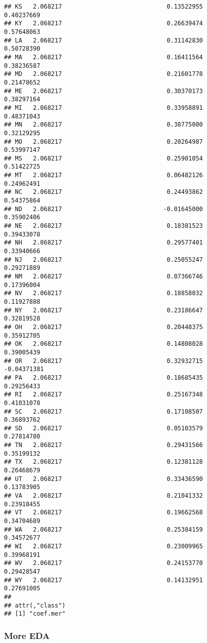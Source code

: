 \documentclass[
]{article}
\begin{document}
\begin{verbatim}
## KS   2.068217                             0.13522955             0.40237669
## KY   2.068217                             0.26639474             0.57648063
## LA   2.068217                             0.31142830             0.50728390
## MA   2.068217                             0.16411564             0.38236587
## MD   2.068217                             0.21601778             0.21478652
## ME   2.068217                             0.30370173             0.38297164
## MI   2.068217                             0.33958891             0.48371043
## MN   2.068217                             0.38775000             0.32129295
## MO   2.068217                             0.20264987             0.53997147
## MS   2.068217                             0.25901054             0.51422725
## MT   2.068217                             0.06482126             0.24962491
## NC   2.068217                             0.24493862             0.54375864
## ND   2.068217                            -0.01645000             0.35902406
## NE   2.068217                             0.18381523             0.39433078
## NH   2.068217                             0.29577401             0.33940666
## NJ   2.068217                             0.25055247             0.29271889
## NM   2.068217                             0.07366746             0.17396004
## NV   2.068217                             0.18858032             0.11927888
## NY   2.068217                             0.23186647             0.32819528
## OH   2.068217                             0.20448375             0.35912705
## OK   2.068217                             0.14808028             0.39005439
## OR   2.068217                             0.32932715            -0.04371381
## PA   2.068217                             0.18685435             0.29256433
## RI   2.068217                             0.25167348             0.41031078
## SC   2.068217                             0.17108507             0.36893762
## SD   2.068217                             0.05103579             0.27814780
## TN   2.068217                             0.29431566             0.35199132
## TX   2.068217                             0.12381128             0.26468679
## UT   2.068217                             0.33436590             0.13783905
## VA   2.068217                             0.21041332             0.23918455
## VT   2.068217                             0.19662568             0.34704689
## WA   2.068217                             0.25384159             0.34572677
## WI   2.068217                             0.23009965             0.39968191
## WV   2.068217                             0.24153770             0.29428547
## WY   2.068217                             0.14132951             0.27691005
## 
## attr(,"class")
## [1] "coef.mer"
\end{verbatim}

\hypertarget{more-eda}{%
\subsubsection{More EDA}\label{more-eda}}
\end{document}
